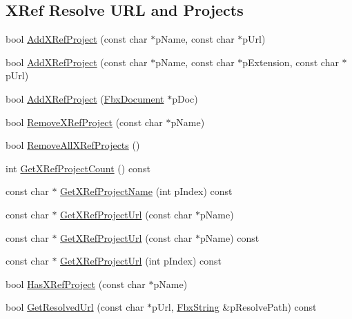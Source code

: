 \subsection*{X\+Ref Resolve U\+RL and Projects}
\begin{DoxyCompactItemize}
\item 
bool \hyperlink{class_fbx_x_ref_manager_ad87a4b521f02567cc10d71ae9a4a83dc}{Add\+X\+Ref\+Project} (const char $\ast$p\+Name, const char $\ast$p\+Url)
\item 
bool \hyperlink{class_fbx_x_ref_manager_a34a0774a5a3e18c024339bb2ceca7488}{Add\+X\+Ref\+Project} (const char $\ast$p\+Name, const char $\ast$p\+Extension, const char $\ast$p\+Url)
\item 
bool \hyperlink{class_fbx_x_ref_manager_a55202f529ee4745e4841478d22bed719}{Add\+X\+Ref\+Project} (\hyperlink{class_fbx_document}{Fbx\+Document} $\ast$p\+Doc)
\item 
bool \hyperlink{class_fbx_x_ref_manager_a910538a083181d0552e00f6a852ac8e4}{Remove\+X\+Ref\+Project} (const char $\ast$p\+Name)
\item 
bool \hyperlink{class_fbx_x_ref_manager_ae590ccb6ae282bed68c60bf697cd2645}{Remove\+All\+X\+Ref\+Projects} ()
\item 
int \hyperlink{class_fbx_x_ref_manager_a3d2b5a3a323b7312b7c4344879791976}{Get\+X\+Ref\+Project\+Count} () const
\item 
const char $\ast$ \hyperlink{class_fbx_x_ref_manager_afdff8c02aaecef12bed630152ba4e2c4}{Get\+X\+Ref\+Project\+Name} (int p\+Index) const
\item 
const char $\ast$ \hyperlink{class_fbx_x_ref_manager_a43c9f593d33d7c8a4275b597d32ecfb7}{Get\+X\+Ref\+Project\+Url} (const char $\ast$p\+Name)
\item 
const char $\ast$ \hyperlink{class_fbx_x_ref_manager_a77d5c777e93f8b03938c07c7ea115dc2}{Get\+X\+Ref\+Project\+Url} (const char $\ast$p\+Name) const
\item 
const char $\ast$ \hyperlink{class_fbx_x_ref_manager_ab8f651bb9163d1c7ba56586c0c879c07}{Get\+X\+Ref\+Project\+Url} (int p\+Index) const
\item 
bool \hyperlink{class_fbx_x_ref_manager_afa24aa1ef0d54bf0288947f9e005ec7c}{Has\+X\+Ref\+Project} (const char $\ast$p\+Name)
\item 
bool \hyperlink{class_fbx_x_ref_manager_a718b1c8f5f9d1e023e8c28811ac84498}{Get\+Resolved\+Url} (const char $\ast$p\+Url, \hyperlink{class_fbx_string}{Fbx\+String} \&p\+Resolve\+Path) const
\end{DoxyCompactItemize}


